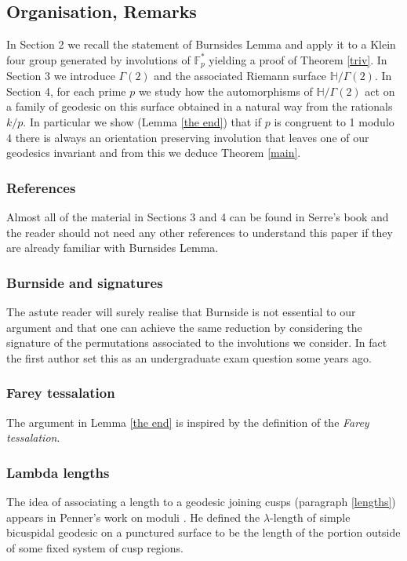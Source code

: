 \documentclass[12pt,a4paper]{amsart}
\def\HH{\mathbb{H}}
\def\xx{\HH/g2}
\def\fp{\mathbb{F}_p}
\def\g2{\Gamma(2)}
\def\xx{\HH/\g2}
\begin{document}
\subsection{Organisation, Remarks}

In Section 2 we recall the statement of Burnsides Lemma 
and apply it to a Klein four group generated by involutions of $\fp^*$
yielding a proof of Theorem \ref{triv}. In Section 3 we introduce $\g2$
and the associated Riemann surface $\xx$. 
In Section 4, for each prime $p$
we study how the automorphisms of $\xx$ 
act on a family of geodesic on this surface
obtained in a natural way from the rationals $k/p$.
In particular we show (Lemma \ref{the end})  that if $p$ is congruent to 1 modulo 4
there is always an orientation preserving involution that
leaves one of our geodesics invariant
and from this we deduce Theorem \ref{main}.

\subsubsection{References}
Almost all  of the material in Sections 3 and 4 
can be found in Serre's book \cite{serre} and the reader
should not need any other references to understand 
this paper if they are already familiar with  Burnsides Lemma.

\subsubsection{Burnside and signatures}
 The astute reader will surely realise that Burnside is not essential to our argument
 and that one can achieve the same reduction by considering the signature
 of the permutations associated to the  involutions we consider. 
 In fact the first author set this as an  undergraduate exam question some years ago.
 
 \subsubsection{Farey tessalation}
 The argument in Lemma \ref{the end} is inspired by the definition of the 
 \textit{Farey tessalation}.
 
  \subsubsection{Lambda lengths}
 The idea of associating a length to a geodesic joining cusps
 (paragraph \ref{lengths}) appears in Penner's work on moduli \cite{bob}.
He defined the $\lambda$-length of simple bicuspidal geodesic 
on a punctured
surface to be the length of the portion outside of some fixed
 system of cusp regions.
 
\end{document}
